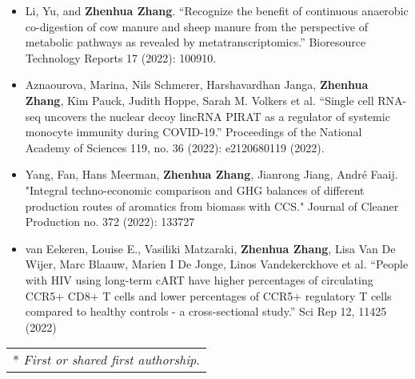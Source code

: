 \documentclass[10pt,A4,english]{article}
\newcommand{\mpwidth}{\linewidth-\fboxsep-\fboxsep}
\newcommand{\cvtextsmall}[1] {
	\begin{tabular*}{0.8\mpwidth}{p{0.8\mpwidth}}
		\parbox{0.8\mpwidth}{#1}
	\end{tabular*}
}
\begin{document}
\begin{paracol}{2}
\begin{rightcolumn}
\begin{itemize}[leftmargin=*]
  \item Li, Yu, and \textbf{Zhenhua Zhang}. \enquote{Recognize the benefit of continuous anaerobic co-digestion of cow manure and sheep manure from the perspective of metabolic pathways as revealed by metatranscriptomics.} Bioresource Technology Reports 17 (2022): 100910.
  \item Aznaourova, Marina, Nils Schmerer, Harshavardhan Janga, \textbf{Zhenhua Zhang}, Kim Pauck, Judith Hoppe, Sarah M. Volkers et al. \enquote{Single cell RNA-seq uncovers the nuclear decoy lincRNA PIRAT as a regulator of systemic monocyte immunity during COVID-19.} Proceedings of the National Academy of Sciences 119, no. 36 (2022): e2120680119 (2022).
  \item Yang, Fan, Hans Meerman, \textbf{Zhenhua Zhang}, Jianrong Jiang, André Faaij. "Integral techno-economic comparison and GHG balances of different production routes of aromatics from biomass with CCS." Journal of Cleaner Production no. 372 (2022): 133727
  \item van Eekeren, Louise E., Vasiliki Matzaraki, \textbf{Zhenhua Zhang}, Lisa Van De Wijer, Marc Blaauw, Marien I De Jonge, Linos Vandekerckhove et al. \enquote{People with HIV using long-term cART have higher percentages of circulating CCR5+ CD8+ T cells and lower percentages of CCR5+ regulatory T cells compared to healthy controls - a cross-sectional study.} Sci Rep 12, 11425 (2022)
\end{itemize}

\cvtextsmall{* \textit{First or shared first authorship}.}


\end{rightcolumn}
\end{paracol}
\end{document}

